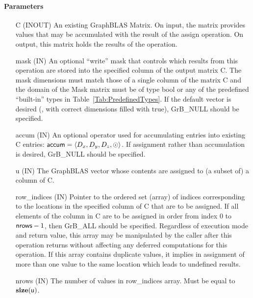 \paragraph{Parameters}

\begin{itemize}[leftmargin=1.1in]
    \item[{\sf C}]    ({\sf INOUT}) An existing GraphBLAS Matrix.  On input,
    the matrix provides values that may be accumulated with the result of the
    assign operation.  On output, this matrix holds the results of the
    operation.

    \item[{\sf mask}] ({\sf IN}) An optional ``write'' mask that controls which
    results from this operation are stored into the specified column of the output matrix {\sf C}. The 
    mask dimensions must match those of a single column of the matrix {\sf C} and the domain of the 
    {\sf Mask} matrix must be of type {\sf bool} or any of the predefined 
    ``built-in'' types in Table~\ref{Tab:PredefinedTypes}.  If the default
    vector is desired (\ie, with correct dimensions filled with {\sf true}), 
    {\sf GrB\_NULL} should be specified.

    \item[{\sf accum}]    ({\sf IN}) An optional operator used for accumulating
    entries into existing {\sf C} entries: ${\sf accum} = \langle D_x,
    D_y, D_z,\odot \rangle$. If assignment rather than accumulation is
    desired, {\sf GrB\_NULL} should be specified.

    \item[{\sf u}]       ({\sf IN}) The GraphBLAS vector whose contents are 
    assigned to (a subset of) a column of {\sf C}.

    \item[{\sf row\_indices}]  ({\sf IN}) Pointer to the ordered set (array) of 
    indices corresponding to the locations in the specified column of {\sf C} 
    that are to be assigned.  If all elements of the column in {\sf C} are to be 
    assigned in order from index $0$ to ${\sf nrows} - 1$, then {\sf GrB\_ALL} should be 
    specified.  Regardless of execution mode and return value, this array may be
    manipulated by the caller after this operation returns without affecting any 
    deferred computations for this operation.
    If this array contains duplicate values, it implies in assignment of more 
    than one value to the same location which leads to undefined results.
    
    \item[{\sf nrows}] ({\sf IN}) The number of values in {\sf row\_indices} array.
    Must be equal to $\bold{size}({\sf u})$.
    

\end{itemize}
